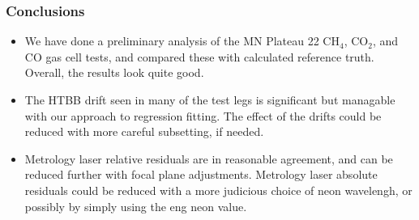 \begin{frame}
\frametitle{Conclusions}
\begin{itemize}

  \item We have done a preliminary analysis of the MN Plateau 22
    CH$_4$, CO$_2$, and CO gas cell tests, and compared these with
    calculated reference truth.  Overall, the results look quite
    good.

  \item The HTBB drift seen in many of the test legs is significant
    but managable with our approach to regression fitting.   The effect
    of the drifts could be reduced with more careful subsetting, if
    needed.

  \item Metrology laser relative residuals are in reasonable
    agreement, and can be reduced further with focal plane
    adjustments.  Metrology laser absolute residuals could be
    reduced with a more judicious choice of neon wavelengh, or 
    possibly by simply using the eng neon value.

\end{itemize}
\end{frame}

